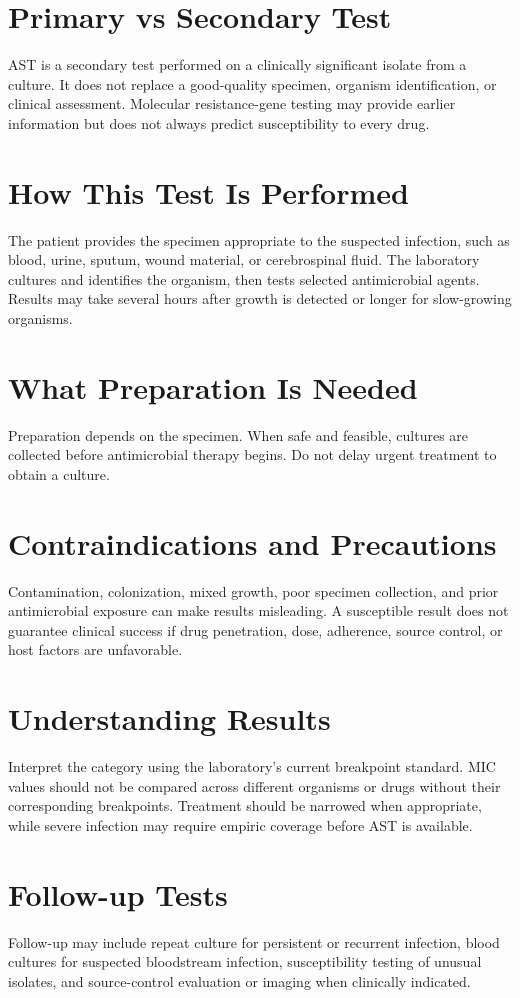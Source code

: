 \section*{Primary vs Secondary Test}
AST is a secondary test performed on a clinically significant isolate from a culture. It does not replace a good-quality specimen, organism identification, or clinical assessment. Molecular resistance-gene testing may provide earlier information but does not always predict susceptibility to every drug.

\section*{How This Test Is Performed}
The patient provides the specimen appropriate to the suspected infection, such as blood, urine, sputum, wound material, or cerebrospinal fluid. The laboratory cultures and identifies the organism, then tests selected antimicrobial agents. Results may take several hours after growth is detected or longer for slow-growing organisms.

\section*{What Preparation Is Needed}
Preparation depends on the specimen. When safe and feasible, cultures are collected before antimicrobial therapy begins. Do not delay urgent treatment to obtain a culture.

\section*{Contraindications and Precautions}
Contamination, colonization, mixed growth, poor specimen collection, and prior antimicrobial exposure can make results misleading. A susceptible result does not guarantee clinical success if drug penetration, dose, adherence, source control, or host factors are unfavorable.

\section*{Understanding Results}
Interpret the category using the laboratory's current breakpoint standard. MIC values should not be compared across different organisms or drugs without their corresponding breakpoints. Treatment should be narrowed when appropriate, while severe infection may require empiric coverage before AST is available.

\section*{Follow-up Tests}
Follow-up may include repeat culture for persistent or recurrent infection, blood cultures for suspected bloodstream infection, susceptibility testing of unusual isolates, and source-control evaluation or imaging when clinically indicated.

